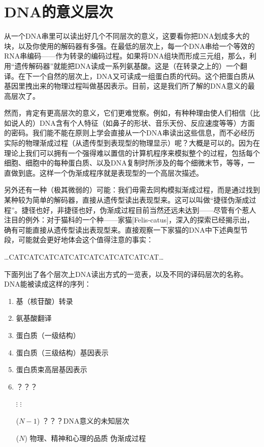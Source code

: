 \section{DNA的意义层次}

从一个DNA串里可以读出好几个不同层次的意义，这要看你把DNA划成多大的块，以及你使用的解码器有多强。在最低的层次上，每一个DNA串给一个等效的RNA串编码——作为转录的编码过程。如果将DNA组块而形成三元组，那么，利用“遗传解码器”就能把DNA读成一系列氨基酸。这是（在转录之上的）一个翻译。在下一个自然的层次上，DNA又可读成一组蛋白质的代码。这个把蛋白质从基因里拽出来的物理过程叫做基因表示。目前，这是我们所了解的DNA意义的最高层次了。

然而，肯定有更高层次的意义，它们更难觉察。例如，有种种理由使人们相信（比如说人的）DNA含有个人特征（如鼻子的形状、音乐天份、反应速度等等）方面的密码。我们能不能在原则上学会直接从一个DNA串读出这些信息，而不必经历实际的物理渐成过程（从遗传型到表现型的物理显示）呢？大概是可以的。因为在理论上我们可以拥有一个强得难以置信的计算机程序来模拟整个的过程，包括每个细胞、细胞中的每种蛋白质、以及DNA复制时所涉及的每个细微末节，等等，一直做到底。这样一个伪渐成程序就是表现型的一个高层次描述。

另外还有一种（极其微弱的）可能：我们毋需去同构模拟渐成过程，而是通过找到某种较为简单的解码器，直接从遗传型读出表现型来。这可以叫做“捷径伪渐成过程”。捷径也好，非捷径也好，伪渐成过程目前当然还远未达到——尽管有个惹人注目的例外：对于猫科的一个种——家猫[Felis-catus]，深入的探索已经揭示出，确有可能直接从遗传型读出表现型来。直接观察一下家猫的DNA中下述典型节段，可能就会更好地体会这个值得注意的事实：
\begin{center}
\ldots CATCATCATCATCATCATCATCATCATCAT\ldots
\end{center}
下面列出了各个层次上DNA读出方式的一览表，以及不同的译码层次的名称。DNA能被读成这样的序列：
\begin{enumerate}
\item 基（核苷酸）\cdotfill 转录
\item 氨基酸\cdotfill 翻译
\item 蛋白质（一级结构）
\item 蛋白质（三级结构）\cdotfill 基因表示
\item 蛋白质束\cdotfill 高层基因表示
\item ？？？
\item[\quad$\vdots$]$\vdots$
\item[($N-1$)] ？？？\cdotfill DNA意义的未知层次
\item[($N$)] 物理、精神和心理的品质 \cdotfill 伪渐成过程
\end{enumerate}

